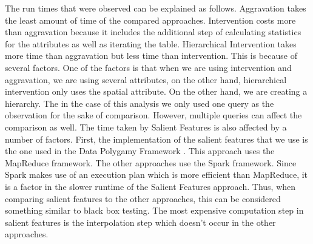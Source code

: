 The run times that were observed can be explained as follows. Aggravation takes the least amount of time of the compared approaches. Intervention costs more than aggravation because it includes the additional step of calculating statistics for the attributes as well as iterating the table. Hierarchical Intervention takes more time than aggravation but less time than intervention. This is because of several factors. One of the factors is that when we are using intervention and aggravation, we are using several attributes, on the other hand, hierarchical intervention only uses the spatial attribute. On the other hand, we are creating a hierarchy. The in the case of this analysis we only used one query as the observation for the sake of comparison. However, multiple queries can affect the comparison as well. The time taken by Salient Features is also affected by a number of factors. First, the implementation of the salient features that we use is the one used in the Data Polygamy Framework \cite{chirigati2016data}. This approach uses the MapReduce framework. The other approaches use the Spark framework. Since Spark makes use of an execution plan which is more efficient than MapReduce, it is a factor in the slower runtime of the Salient Features approach. Thus, when comparing salient features to the other approaches, this can be considered something similar to black box testing. The most expensive computation step in salient features is the interpolation step which doesn't occur in the other approaches.


